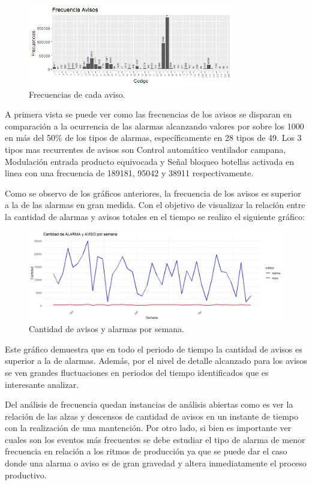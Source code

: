 \documentclass[10pt]{article}
\begin{document}
\begin{figure}[H]
\includegraphics[width=0.8\textwidth]{Graficos/FrecuenciaAvisos.png}
  \caption{Frecuencias de cada aviso.}
\end{figure}

A primera vista se puede ver como las frecuencias de los avisos se disparan en comparación a la ocurrencia de las alarmas alcanzando valores por sobre los 1000 en más del 50\% de los tipos de alarmas, específicamente en 28 tipos de 49. Los 3 tipos mas recurrentes de avisos son Control automático ventilador campana, Modulación entrada producto equivocada y Señal bloqueo botellas activada en linea con una frecuencia de 189181, 95042 y 38911 respectivamente.

Como se observo de los gráficos anteriores, la frecuencia de los avisos es superior a la de las alarmas en gran medida. Con el objetivo de visualizar la relación entre la cantidad de alarmas y avisos totales en el tiempo se realizo el siguiente gráfico: 

\begin{figure}[H]
\includegraphics[width=1.1\textwidth]{Graficos/Avisos_Alarmas_semana.jpeg}
\caption{Cantidad de avisos y alarmas por semana.}
\end{figure}

Este gráfico demuestra que en todo el periodo de tiempo la cantidad de avisos es superior a la de alarmas. Además, por el nivel de detalle alcanzado para los avisos se ven grandes fluctuaciones en periodos del tiempo identificados que es interesante analizar. 

Del análisis de frecuencia quedan instancias de análisis abiertas como es ver la relación de las alzas y descensos de cantidad de avisos en un instante de tiempo con la realización de una mantención. Por otro lado, si bien es importante ver cuales son los eventos más frecuentes se debe estudiar el tipo de alarma de menor frecuencia en relación a los ritmos de producción ya que se puede dar el caso donde una alarma o aviso es de gran gravedad y altera inmediatamente el proceso productivo. 
\end{document}
